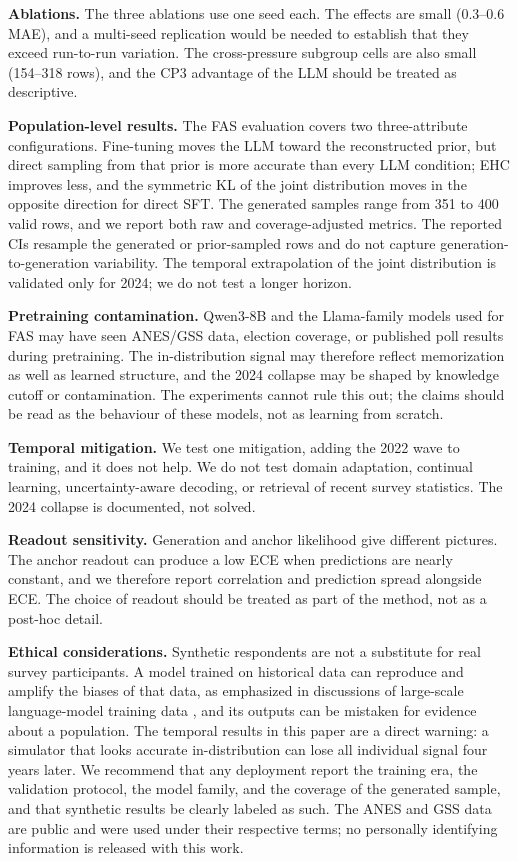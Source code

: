 \textbf{Ablations.} The three ablations use one seed each. The effects
are small (0.3--0.6 MAE), and a multi-seed replication would be needed
to establish that they exceed run-to-run variation. The cross-pressure
subgroup cells are also small (154--318 rows), and the CP3 advantage of
the LLM should be treated as descriptive.

\textbf{Population-level results.} The FAS evaluation covers two
three-attribute configurations. Fine-tuning moves the LLM toward the
reconstructed prior, but direct sampling from that prior is more
accurate than every LLM condition; EHC improves less, and the symmetric
KL of the joint distribution moves in the opposite direction for direct
SFT. The generated samples range from 351 to 400 valid rows, and we
report both raw and coverage-adjusted metrics. The reported CIs resample
the generated or prior-sampled rows and do not capture
generation-to-generation variability. The temporal extrapolation of the
joint distribution is validated only for 2024; we do not test a longer
horizon.

\textbf{Pretraining contamination.} Qwen3-8B and the Llama-family models
used for FAS may have seen ANES/GSS data, election coverage, or
published poll results during pretraining. The in-distribution signal
may therefore reflect memorization as well as learned structure, and the
2024 collapse may be shaped by knowledge cutoff or contamination. The
experiments cannot rule this out; the claims should be read as the
behaviour of these models, not as learning from scratch.

\textbf{Temporal mitigation.} We test one mitigation, adding the 2022
wave to training, and it does not help. We do not test domain
adaptation, continual learning, uncertainty-aware decoding, or retrieval
of recent survey statistics. The 2024 collapse is documented, not
solved.

\textbf{Readout sensitivity.} Generation and anchor likelihood give
different pictures. The anchor readout can produce a low ECE when
predictions are nearly constant, and we therefore report correlation and
prediction spread alongside ECE. The choice of readout should be treated
as part of the method, not as a post-hoc detail.

\textbf{Ethical considerations.} Synthetic respondents are not a
substitute for real survey participants. A model trained on historical
data can reproduce and amplify the biases of that data, as emphasized in
discussions of large-scale language-model training data
\citep{bender2021stochastic}, and its outputs can be mistaken for
evidence about a population. The temporal results in this paper are a
direct warning: a simulator that looks accurate in-distribution can lose
all individual signal four years later. We recommend that any deployment
report the training era, the validation protocol, the model family, and
the coverage of the generated sample, and that synthetic results be
clearly labeled as such. The ANES and GSS data are public and were used
under their respective terms; no personally identifying information is
released with this work.

